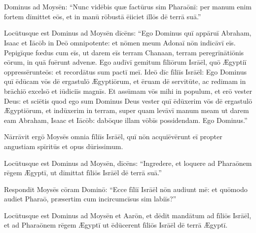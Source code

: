 \chapter{}
\thispagestyle{empty}

 Dominus ad Moysēn: ``Nunc vidēbis quæ factūrus
sim Pharaōnī: per manum enim fortem dīmittet eōs, et in
manū rōbustā ēiiciet illōs dē
terrā suā.''

Locūtusque est
Dominus ad Moysēn dīcēns: ``Ego Dominus quī appāruī
Abraham, Isaac et Iācōb in Deō omnipotente:
et nōmen meum Adonaī
nōn indicāvī eīs. 
Pepigīque fœdus cum eīs, ut darem eīs terram
Chanaan, terram peregrīnātiōnis eōrum, in
quā fuērunt advenæ.  Ego audīvī gemitum fīliōrum Isrāēl, quō Ægyptiī
oppressērunt\linebreak eōs:
et recordātus sum pactī meī.  Ideō dīc
fīliīs Isrāēl: Ego Dominus quī ēdūcam vōs dē
ergastulō Ægyptiōrum, et ēruam dē servitūte, ac redimam in
brāchiō excelsō et
iūdiciīs
magnīs.  Et assūmam vōs mihi in populum, et erō vester Deus: et sciētis
quod ego sum Dominus Deus vester quī ēdūxerim vōs dē
ergastulō Ægyptiōrum,  et indūxerim in terram, super quam
levāvī manum meam ut darem eam Abraham, Isaac et Iācōb:
dabōque illam vōbīs possidendam. Ego Dominus.''

Nārrāvit ergō
Moysēs omnia fīliīs Isrāēl, quī nōn
acquiēvērunt eī propter angustiam
spīritūs et opus dūrissimum.  

Locūtusque est Dominus ad
Moysēn, dīcēns:  ``Ingredere, et
loquere ad Pharaōnem rēgem Ægyptī, ut dīmittat fīliōs
Isrāēl dē terrā suā.''

Respondit Moysēs
cōram Dominō: ``Ecce fīliī Isrāēl nōn audiunt mē: et
quōmodo audiet Pharaō, præsertim cum
incircumcīs\-us sim labiīs?''

Locūtusque est Dominus ad
Moysēn et Aarōn, et dēdit mandātum ad
fīliōs Isrāēl, et ad Pharaōnem rēgem Ægyptī
ut ēdūcerent fīliōs Isrāēl dē terrā Ægyptī.
